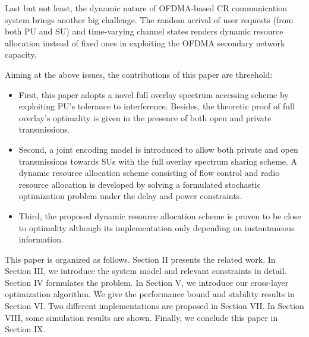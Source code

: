 \documentclass[journal]{IEEEtran}
\begin{document}
Last but not least, the dynamic nature of OFDMA-based CR communication system brings another big challenge.  The random arrival of user
requests (from both PU and SU) and time-varying channel states renders dynamic resource allocation instead of fixed ones in exploiting the OFDMA secondary network capacity.

 Aiming at the above issues, the contributions of this paper are threehold:
 \begin{itemize}
\item First, this paper adopts a novel full overlay spectrum accessing scheme by exploiting PU's tolerance to interference.  Besides, the theoretic proof of  full { overlay's} optimality is
    given in the presence of both open and private transmissions.


\item Second, a joint encoding model is introduced to allow both private and open transmissions towards SUs with the full overlay spectrum sharing scheme. A dynamic resource allocation scheme consisting of flow control and radio resource allocation is developed by solving a formulated stochastic optimization problem under the delay and power constraints.

 \item Third, the proposed dynamic resource allocation scheme is proven to be close to optimality although its implementation only depending on instantaneous information.
\end{itemize}

This paper is organized as follows. Section II presents the related work. In Section III, we  introduce the system model and
relevant constraints in detail. Section IV formulates the problem. In Section V, we introduce our cross-layer optimization
algorithm.  We give the
performance bound and stability results in Section VI. Two different implementations are proposed in Section VII. In Section
VIII, some simulation results are shown. Finally, we conclude this paper in Section IX.
\end{document}
